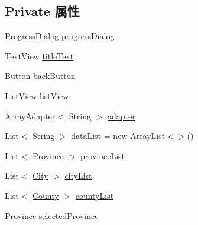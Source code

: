 \subsection*{Private 属性}
\begin{DoxyCompactItemize}
\item 
Progress\+Dialog \mbox{\hyperlink{classcom_1_1example_1_1akisame__lin_1_1love__air2_1_1weather_1_1_choose_area_fragment_ac824fd4c322965c4ce427d60bcebc807}{progress\+Dialog}}
\item 
Text\+View \mbox{\hyperlink{classcom_1_1example_1_1akisame__lin_1_1love__air2_1_1weather_1_1_choose_area_fragment_a11207b2aac12d294e191b26e83b68467}{title\+Text}}
\item 
Button \mbox{\hyperlink{classcom_1_1example_1_1akisame__lin_1_1love__air2_1_1weather_1_1_choose_area_fragment_aef9f2c701a5339ceda1e62b37395ece3}{back\+Button}}
\item 
List\+View \mbox{\hyperlink{classcom_1_1example_1_1akisame__lin_1_1love__air2_1_1weather_1_1_choose_area_fragment_ab335ab586f3637fa3e23af6ac115cd84}{list\+View}}
\item 
Array\+Adapter$<$ String $>$ \mbox{\hyperlink{classcom_1_1example_1_1akisame__lin_1_1love__air2_1_1weather_1_1_choose_area_fragment_a187f0761fce899d669dbe54356fff99a}{adapter}}
\item 
List$<$ String $>$ \mbox{\hyperlink{classcom_1_1example_1_1akisame__lin_1_1love__air2_1_1weather_1_1_choose_area_fragment_ac849e2b432fb77749d831b8b5eada683}{data\+List}} = new Array\+List$<$$>$()
\item 
List$<$ \mbox{\hyperlink{classcom_1_1example_1_1akisame__lin_1_1love__air2_1_1weather_1_1db_1_1_province}{Province}} $>$ \mbox{\hyperlink{classcom_1_1example_1_1akisame__lin_1_1love__air2_1_1weather_1_1_choose_area_fragment_a0955175dfc73b05c7195cd907e268c54}{province\+List}}
\item 
List$<$ \mbox{\hyperlink{classcom_1_1example_1_1akisame__lin_1_1love__air2_1_1weather_1_1db_1_1_city}{City}} $>$ \mbox{\hyperlink{classcom_1_1example_1_1akisame__lin_1_1love__air2_1_1weather_1_1_choose_area_fragment_acfc338c14a88d34134116bd7e37221c2}{city\+List}}
\item 
List$<$ \mbox{\hyperlink{classcom_1_1example_1_1akisame__lin_1_1love__air2_1_1weather_1_1db_1_1_county}{County}} $>$ \mbox{\hyperlink{classcom_1_1example_1_1akisame__lin_1_1love__air2_1_1weather_1_1_choose_area_fragment_aaf04b51df6b3589edfc7d0bd4642f2ec}{county\+List}}
\item 
\mbox{\hyperlink{classcom_1_1example_1_1akisame__lin_1_1love__air2_1_1weather_1_1db_1_1_province}{Province}} \mbox{\hyperlink{classcom_1_1example_1_1akisame__lin_1_1love__air2_1_1weather_1_1_choose_area_fragment_a0e115ccb1f8db8b5673b33d600593729}{selected\+Province}}
$$
\end{DoxyCompactItemize}
